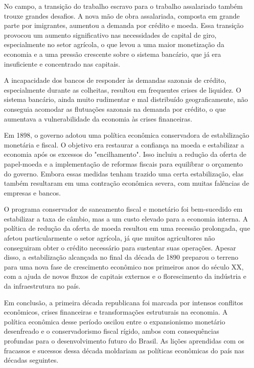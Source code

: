 \documentclass[a4paper,12pt]{article}[abntex2]
\begin{document}
No campo, a transição do trabalho escravo para o trabalho assalariado também trouxe grandes desafios. A nova mão de obra assalariada, composta em grande parte por imigrantes, aumentou a demanda por crédito e moeda. Essa transição provocou um aumento significativo nas necessidades de capital de giro, especialmente no setor agrícola, o que levou a uma maior monetização da economia e a uma pressão crescente sobre o sistema bancário, que já era insuficiente e concentrado nas capitais. 

A incapacidade dos bancos de responder às demandas sazonais de crédito, especialmente durante as colheitas, resultou em frequentes crises de liquidez. O sistema bancário, ainda muito rudimentar e mal distribuído geograficamente, não conseguia acomodar as flutuações sazonais na demanda por crédito, o que aumentava a vulnerabilidade da economia às crises financeiras.

Em 1898, o governo adotou uma política econômica conservadora de estabilização monetária e fiscal. O objetivo era restaurar a confiança na moeda e estabilizar a economia após os excessos do "encilhamento". Isso incluiu a redução da oferta de papel-moeda e a implementação de reformas fiscais para equilibrar o orçamento do governo. Embora essas medidas tenham trazido uma certa estabilização, elas também resultaram em uma contração econômica severa, com muitas falências de empresas e bancos.

O programa conservador de saneamento fiscal e monetário foi bem-sucedido em estabilizar a taxa de câmbio, mas a um custo elevado para a economia interna. A política de redução da oferta de moeda resultou em uma recessão prolongada, que afetou particularmente o setor agrícola, já que muitos agricultores não conseguiram obter o crédito necessário para sustentar suas operações. Apesar disso, a estabilização alcançada no final da década de 1890 preparou o terreno para uma nova fase de crescimento econômico nos primeiros anos do século XX, com a ajuda de novos fluxos de capitais externos e o florescimento da indústria e da infraestrutura no país.

Em conclusão, a primeira década republicana foi marcada por intensos conflitos econômicos, crises financeiras e transformações estruturais na economia. A política econômica desse período oscilou entre o expansionismo monetário desenfreado e o conservadorismo fiscal rígido, ambos com consequências profundas para o desenvolvimento futuro do Brasil. As lições aprendidas com os fracassos e sucessos dessa década moldariam as políticas econômicas do país nas décadas seguintes.
\end{document}
